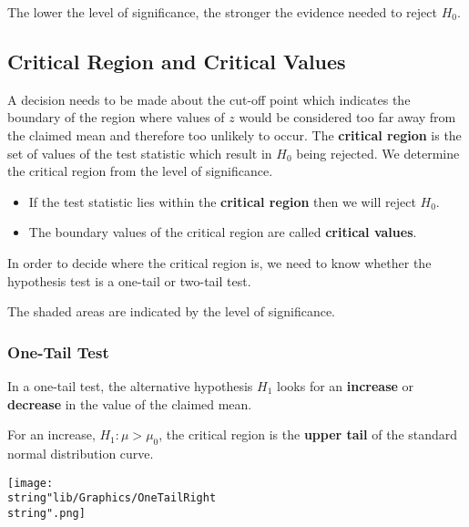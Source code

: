\documentclass[11pt,a4paper]{book}
\begin{document}
The lower the level of significance, the stronger the evidence needed
to reject $H_{0}$.

\newpage

\subsection{Critical Region and Critical Values}

A decision needs to be made about the cut-off point which indicates
the boundary of the region where values of $z$ would be considered
too far away from the claimed mean and therefore too unlikely to occur.
The \textbf{critical region} is the set of values of the test statistic
which result in $H_{0}$ being rejected. We determine the critical
region from the level of significance.

\begin{tcolorbox}[colback=blue!5, colframe=black, boxrule=.4pt, sharpish corners]

\begin{itemize}
\item If the test statistic lies within the \textbf{critical region} then
we will reject $H_{0}$.
\item The boundary values of the critical region are called \textbf{critical
values}.
\end{itemize}
\end{tcolorbox}

In order to decide where the critical region is, we need to know whether
the hypothesis test is a one-tail or two-tail test.

The shaded areas are indicated by the level of significance.

\subsubsection*{One-Tail Test}

In a one-tail test, the alternative hypothesis $H_{1}$ looks for
an \textbf{increase} or \textbf{decrease} in the value of the claimed
mean.

\begin{minipage}[t]{.5\textwidth}

For an increase, $H_{1}:\mu>\mu_{0}$, the critical region is the
\textbf{upper tail} of the standard normal distribution curve.

\end{minipage}
\begin{minipage}[t]{.5\textwidth}
\begin{center}
\texttt{[image: \\string"lib/Graphics/OneTailRight\\string".png]}
\par\end{center}

\end{minipage}
\end{document}
